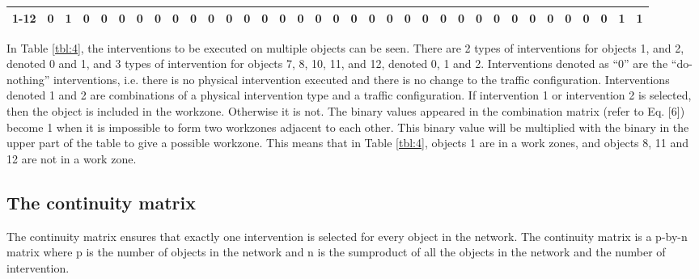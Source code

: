 \documentclass[a4paper,3p,times,authoryear]{elsarticle}
\begin{document}
\begin{table}[H]
{\begin{tabular}{|l|l|l|l|l|l|l|l|l|l|l|l|l|l|l|l|l|l|l|l|l|l|l|l|l|l|l|l|l|l|l|l|l|l|l|}
\hline
\multicolumn{1}{|c|}{ 1-12} & \multicolumn{1}{c|}{0} & \multicolumn{1}{c|}{\cellcolor{blue!25}1} & \multicolumn{1}{c|}{0} & \multicolumn{1}{c|}{0} & \multicolumn{1}{c|}{0} & \multicolumn{1}{c|}{0} & \multicolumn{1}{c|}{0} & \multicolumn{1}{c|}{0} & \multicolumn{1}{c|}{0} & \multicolumn{1}{c|}{0} & \multicolumn{1}{c|}{0} & \multicolumn{1}{c|}{0} & \multicolumn{1}{c|}{0} & \multicolumn{1}{c|}{0} & \multicolumn{1}{c|}{0} & \multicolumn{1}{c|}{0} & \multicolumn{1}{c|}{0} & \multicolumn{1}{c|}{0} & \multicolumn{1}{c|}{0} & \multicolumn{1}{c|}{0} & \multicolumn{1}{c|}{0} & \multicolumn{1}{c|}{0} & \multicolumn{1}{c|}{0} & \multicolumn{1}{c|}{0} & \multicolumn{1}{c|}{0} & \multicolumn{1}{c|}{0} & \multicolumn{1}{c|}{0} & \multicolumn{1}{c|}{0} & \multicolumn{1}{c|}{0} & \multicolumn{1}{c|}{0} & \multicolumn{1}{c|}{0} & \multicolumn{1}{c|}{0} & \multicolumn{1}{c|}{\cellcolor{blue!25}1} & \multicolumn{1}{c|}{\cellcolor{blue!25}1} \\ 
\hline
\end{tabular}}
\end{table}

In Table \ref{tbl:4}, the interventions to be executed on multiple objects can
be seen. There are 2 types of interventions for objects 1, and 2, denoted 0 and
1, and 3 types of intervention for objects 7, 8, 10, 11, and 12, denoted 0, 1 and
2. Interventions denoted as ``0'' are the ``do-nothing'' interventions, i.e.
there is no physical intervention executed and there is no change to the traffic
configuration. Interventions denoted 1 and 2 are combinations of a physical
intervention type and a traffic configuration. If intervention 1 or intervention
2 is selected, then the object is included in the workzone. Otherwise it is not.
The binary values appeared in the combination matrix (refer to Eq. [6]) become 1
when it is impossible to form two workzones adjacent to each other. This binary
value will be multiplied with the binary in the upper part of the table to give a
possible workzone. This means that in Table \ref{tbl:4}, objects 1 are in a work
zones, and objects 8, 11 and 12 are not in a work zone.

\subsection{The continuity matrix}

The continuity matrix ensures that exactly one intervention is selected for
every object in the network. The continuity matrix is a p-by-n matrix where p is
the number of objects in the network and n is the sumproduct of all the objects
in the network and the number of intervention.
\end{document}
